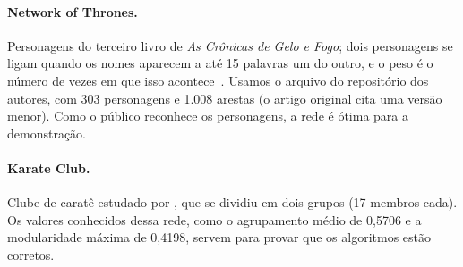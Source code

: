 \paragraph{Network of Thrones.} Personagens do terceiro livro de \emph{As Crônicas de Gelo e
Fogo}; dois personagens se ligam quando os nomes aparecem a até 15 palavras um do outro, e o peso
é o número de vezes em que isso acontece~\cite{beveridge2016}. Usamos o arquivo do repositório
dos autores, com 303 personagens e 1.008 arestas (o artigo original cita uma versão menor).
Como o público reconhece os personagens, a rede é ótima para a demonstração.

\paragraph{Karate Club.} Clube de caratê estudado por \cite{zachary1977}, que se dividiu em
dois grupos (17 membros cada). Os valores conhecidos dessa rede, como o agrupamento médio de
0,5706 e a modularidade máxima de 0,4198, servem para provar que os algoritmos estão corretos.
